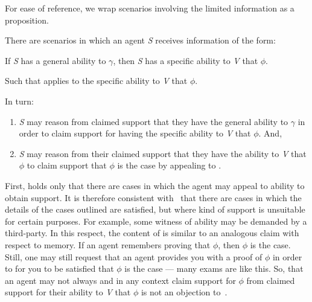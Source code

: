 \begin{note}
  For ease of reference, we wrap scenarios involving the limited information as a proposition.
  \begin{proposition}[\eA{-} --- \eA{}]\label{prop:SE}
    There are scenarios in which an agent \emph{S} receives \gsi{} information of the form:
    \begin{center}
      If \emph{S} has a general ability to \(\gamma\), then \emph{S} has a specific ability to \emph{V} that \(\phi\).
    \end{center}

    \noindent Such that  applies to the specific ability to \emph{V} that \(\phi\).

    In turn:
    \begin{enumerate}
    \item \emph{S} may reason from claimed support that they have the general ability to \(\gamma\) in order to claim support for having the specific ability to \emph{V} that \(\phi\). And,
    \item \emph{S} may reason from their claimed support that they have the ability to \emph{V} that \(\phi\) to claim support that \(\phi\) is the case by appealing to .
    \end{enumerate}
    \vspace{-\topsep}\vspace{-\topsep}
  \end{proposition}
\end{note}

\begin{note}
  First, \eA{} holds only that there are cases in which the agent may appeal to ability to obtain support.
  It is therefore consistent with~\eA{} that there are cases in which the details of the cases outlined are satisfied, but where kind of support is unsuitable for certain purposes.
  For example, some witness of ability may be demanded by a third-party.
  In this respect, the content of \eA{} is similar to an analogous claim with respect to memory.
  If an agent remembers proving that \(\phi\), then \(\phi\) is the case.
  Still, one may still request that an agent provides you with a proof of \(\phi\) in order to for you to be satisfied that \(\phi\) is the case --- many exams are like this.
  So, that an agent may not always and in any context claim support for \(\phi\) from claimed support for their ability to \emph{V} that \(\phi\) is not an objection to~\eA{}.
\end{note}


